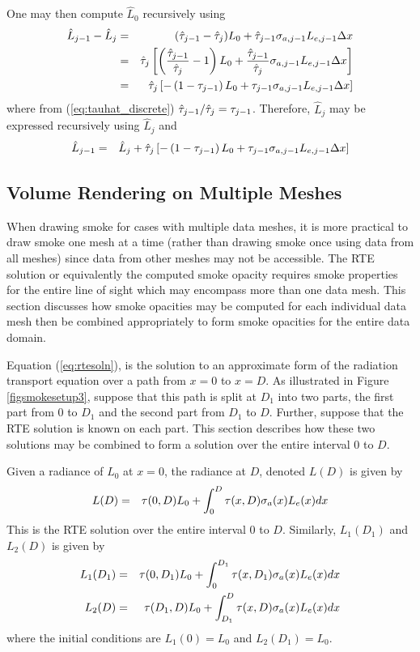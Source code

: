 One may then compute $\hat{L}_0$ recursively using
\begin{eqnarray}
\hat{L}_{j-1} -\hat{L}_{j}&= &(\hat{\tau}_{j-1}-\hat{\tau}_{j})L_0 + \hat{\tau}_{j-1}\sigma_{a,j-1}L_{e,j-1}\Delta x\\
                        &= &\hat{\tau}_{j}\left[\left(\frac{\hat{\tau}_{j-1}}{\hat{\tau}_{j}}-1\right)L_0 + \frac{\hat{\tau}_{j-1}}{\hat{\tau}_{j}}\sigma_{a,j-1}L_{e,j-1}\Delta x\right]\\
                        &= &\hat{\tau}_{j}\left[-\left(1-\tau_{j-1}\right)L_0 + \tau_{j-1}\sigma_{a,j-1}L_{e,j-1}\Delta x\right]\\
\end{eqnarray}
where from (\ref{eq:tauhat_discrete}) $\hat{\tau}_{j-1}/\hat{\tau}_{j}=\tau_{j-1}$.  Therefore, $\hat{L}_j$ may be expressed recursively using $\hat{L}_{j}$ and
\begin{eqnarray}
\hat{L}_{j-1} &= &\hat{L}_{j}+\hat{\tau}_{j}\left[-\left(1-\tau_{j-1}\right)L_0 + \tau_{j-1}\sigma_{a,j-1}L_{e,j-1}\Delta x\right]
\end{eqnarray}

%
%

\subsection{Volume Rendering on Multiple Meshes}
When drawing smoke for cases with multiple data meshes, it is more practical to draw smoke one mesh at a time (rather than drawing smoke once using data from all meshes) since data from other meshes may not be accessible.  The RTE solution or equivalently the computed smoke opacity requires smoke properties for the entire line of sight which may encompass more than one data mesh.  This section discusses how smoke opacities may be computed for each individual data mesh then be combined appropriately to form smoke opacities for the entire data domain.

Equation (\ref{eq:rtesoln}), is the solution to an approximate form of the radiation transport equation over a path
from $x=0$ to $x=D$.  As illustrated in Figure \ref{figsmokesetup3},
suppose that this path is split at $D_1$ into two parts, the first part from $0$ to $D_1$ and the second part from $D_1$ to $D$.
Further, suppose that the RTE solution is known on each part.
This section describes how these two solutions may be combined to form a solution
over the entire interval $0$ to $D$.

Given a radiance of $L_0$ at $x=0$, the radiance at $D$, denoted $L(D)$ is given by
\begin{eqnarray}
\label{eq:rtesoln2}
L(D)&=&\tau(0,D)L_0 + \int_0^D\tau(x,D)\sigma_a(x)L_e(x) dx
\end{eqnarray}
This is the RTE solution over the entire interval $0$ to $D$.
Similarly, $L_1(D_1)$ and $L_2(D)$ is given by
\begin{eqnarray*}
L_1(D_1)&=&\tau(0,D_1)L_0 + \int_0^{D_1}\tau(x,D_1)\sigma_a(x)L_e(x) dx\\
L_2(D)&=&\tau(D_1,D)L_0 + \int_{D_1}^{D}\tau(x,D)\sigma_a(x)L_e(x) dx
\end{eqnarray*}
where the initial conditions are $L_1(0)=L_0$ and $L_2(D_1)=L_0$.

